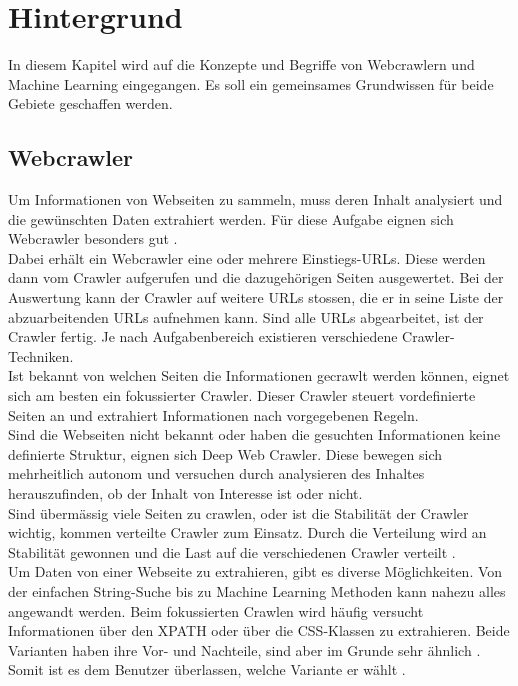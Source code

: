 \section{Hintergrund}
In diesem Kapitel wird auf die Konzepte und Begriffe von Webcrawlern und Machine Learning eingegangen. Es soll ein gemeinsames Grundwissen für beide Gebiete geschaffen werden.
%
\subsection{Webcrawler}
Um Informationen von Webseiten zu sammeln, muss deren Inhalt analysiert und die gewünschten Daten extrahiert werden. Für diese Aufgabe eignen sich Webcrawler besonders gut \cite{scrapy_1, scrapy_2}.\\
Dabei erhält ein Webcrawler eine oder mehrere Einstiegs-URLs. Diese werden dann vom Crawler aufgerufen und die dazugehörigen Seiten ausgewertet. Bei der Auswertung kann der Crawler auf weitere URLs stossen, die er in seine Liste der abzuarbeitenden URLs aufnehmen kann. Sind alle URLs abgearbeitet, ist der Crawler fertig. Je nach Aufgabenbereich existieren verschiedene Crawler-Techniken.\\
Ist bekannt von welchen Seiten die Informationen gecrawlt werden können, eignet sich am besten ein fokussierter Crawler. Dieser Crawler steuert vordefinierte Seiten an und extrahiert Informationen nach vorgegebenen Regeln.\\
Sind die Webseiten nicht bekannt oder haben die gesuchten Informationen keine definierte Struktur, eignen sich Deep Web Crawler. Diese bewegen sich mehrheitlich autonom und versuchen durch analysieren des Inhaltes herauszufinden, ob der Inhalt von Interesse ist oder nicht.\\
Sind übermässig viele Seiten zu crawlen, oder ist die Stabilität der Crawler wichtig, kommen verteilte Crawler zum Einsatz. Durch die Verteilung wird an Stabilität gewonnen und die Last auf die verschiedenen Crawler verteilt \cite{scrapy_3}.\\[2ex]
%
Um Daten von einer Webseite zu extrahieren, gibt es diverse Möglichkeiten. Von der einfachen String-Suche bis zu Machine Learning Methoden kann nahezu alles angewandt werden. Beim fokussierten Crawlen wird häufig versucht Informationen über den XPATH oder über die CSS-Klassen zu extrahieren. Beide Varianten haben ihre Vor- und Nachteile, sind aber im Grunde sehr ähnlich \cite{xpath_vs_css}. Somit ist es dem Benutzer überlassen, welche Variante er wählt \cite{xpath}.\\[2ex]
